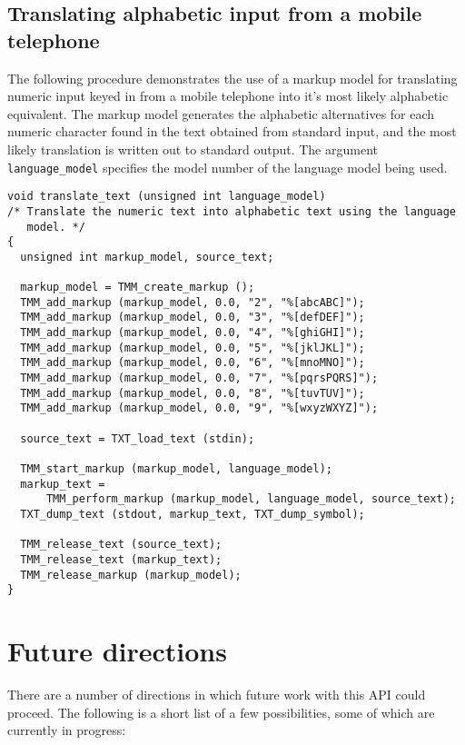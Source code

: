\documentclass[11pt]{article}
\begin{document}
\subsection{Translating alphabetic input from a mobile telephone}

The following procedure demonstrates the use of a markup model for
translating numeric input keyed in from a mobile
telephone into it's most likely alphabetic equivalent.
The markup model generates the alphabetic alternatives for each numeric
character found in the text obtained from standard input, and the most likely
translation is written out to standard output. The argument \verb|language_model|
specifies the model number of the language model being used.

\begin{verbatim}
void translate_text (unsigned int language_model)
/* Translate the numeric text into alphabetic text using the language
   model. */
{
  unsigned int markup_model, source_text;

  markup_model = TMM_create_markup ();
  TMM_add_markup (markup_model, 0.0, "2", "%[abcABC]");
  TMM_add_markup (markup_model, 0.0, "3", "%[defDEF]");
  TMM_add_markup (markup_model, 0.0, "4", "%[ghiGHI]");
  TMM_add_markup (markup_model, 0.0, "5", "%[jklJKL]");
  TMM_add_markup (markup_model, 0.0, "6", "%[mnoMNO]");
  TMM_add_markup (markup_model, 0.0, "7", "%[pqrsPQRS]");
  TMM_add_markup (markup_model, 0.0, "8", "%[tuvTUV]");
  TMM_add_markup (markup_model, 0.0, "9", "%[wxyzWXYZ]");

  source_text = TXT_load_text (stdin);

  TMM_start_markup (markup_model, language_model);
  markup_text =
      TMM_perform_markup (markup_model, language_model, source_text);
  TXT_dump_text (stdout, markup_text, TXT_dump_symbol);

  TMM_release_text (source_text);
  TMM_release_text (markup_text);
  TMM_release_markup (markup_model);
}
\end{verbatim}

\section{Future directions}

There are a number of directions in which future work with this API could proceed. The following is a
short list of a few possibilities, some of which are currently in progress:
\end{document}
